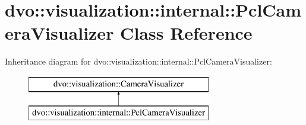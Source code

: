 \hypertarget{classdvo_1_1visualization_1_1internal_1_1_pcl_camera_visualizer}{}\section{dvo\+:\+:visualization\+:\+:internal\+:\+:Pcl\+Camera\+Visualizer Class Reference}
\label{classdvo_1_1visualization_1_1internal_1_1_pcl_camera_visualizer}
Inheritance diagram for dvo\+:\+:visualization\+:\+:internal\+:\+:Pcl\+Camera\+Visualizer\+:\begin{figure}[H]
\begin{center}
\leavevmode
\includegraphics[height=2.000000cm]{classdvo_1_1visualization_1_1internal_1_1_pcl_camera_visualizer}
\end{center}
\end{figure}
